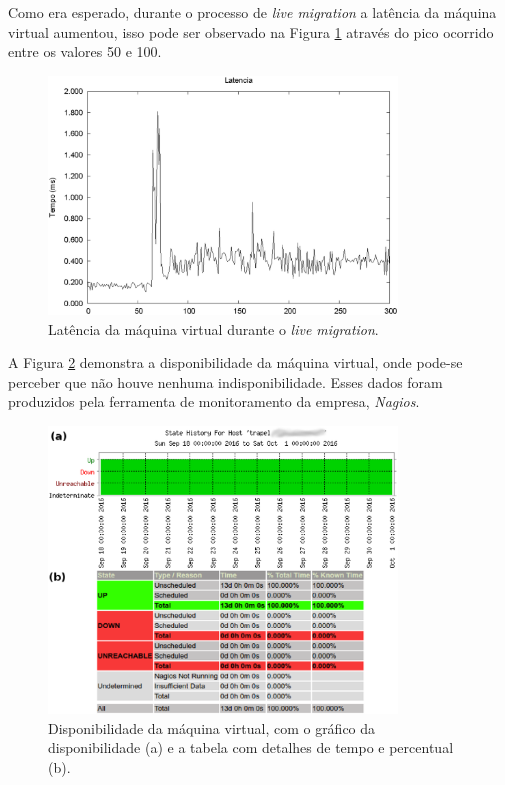 Como era esperado, durante o processo de \textit{live migration} a latência da máquina virtual aumentou, isso pode ser observado na Figura 
\ref{fig:teste2_latencia} através do pico ocorrido entre os valores 50 e 100.
\begin{figure}[h!]
 \centering
 \includegraphics[width=350px]{img/teste2_latencia.eps}
 \caption{Latência da máquina virtual durante o \textit{live migration}.}
 \label{fig:teste2_latencia}
\end{figure}

A Figura \ref{fig:teste2_trapel1} demonstra a disponibilidade da máquina virtual, onde pode-se perceber que não houve nenhuma indisponibilidade. 
Esses dados foram produzidos pela ferramenta de monitoramento da empresa, \textit{Nagios}. 
\begin{figure}[h!]
 \centering
 \includegraphics[width=350px]{img/teste2_trapel1.eps}
 \caption{Disponibilidade da máquina virtual, com o gráfico da disponibilidade (a) e a tabela com detalhes de tempo e percentual (b).}
 \label{fig:teste2_trapel1}
\end{figure}

